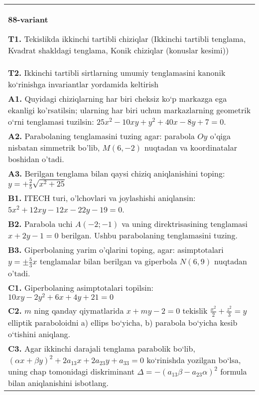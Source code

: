 \documentclass{article}
\begin{document}
\begin{tabular}{m{17cm}}
\textbf{88-variant}
\newline

\textbf{T1.} Tekislikda ikkinchi tartibli chiziqlar (Ikkinchi tartibli tenglama, Kvadrat shakldagi tenglama, Konik chiziqlar (konuslar kesimi)) \\
\textbf{T2.} Ikkinchi tartibli sirtlarning umumiy tenglamasini kanonik ko‘rinishga invariantlar yordamida keltirish \\
\textbf{A1.} Quyidagi chiziqlarning har biri cheksiz ko‘p markazga ega ekanligi ko'rsatilsin; ularning har biri uchun markazlarning geometrik o‘rni tenglamasi tuzilsin: $25 x^2-10 x y+y^2+40 x-8 y+7=0$. \\
\textbf{A2.} Parabolaning tenglamasini tuzing agar: parabola $O y$ o'qiga nisbatan simmetrik bo'lib, $M(6,-2)$ nuqtadan va koordinatalar boshidan o'tadi. \\
\textbf{A3.} Berilgan tenglama bilan qaysi chiziq aniqlanishini toping: $y=+\frac{2}{5} \sqrt{x^2+25}$ \\
\textbf{B1.} ITECH turi, o'lchovlari va joylashishi aniqlansin: $5 x^2+12 x y-12 x-22 y-19=0$. \\
\textbf{B2.} Parabola uchi $A(-2;-1)$ va uning direktrisasining tenglamasi $x+2y-1=0$ berilgan. Ushbu parabolaning tenglamasini tuzing. \\
\textbf{B3.} Giperbolaning yarim o'qlarini toping, agar: asimptotalari $y= \pm \frac{5}{3} x$ tenglamalar bilan berilgan va giperbola $N(6,9)$ nuqtadan o'tadi. \\
\textbf{C1.} Giperbolaning asimptotalari topilsin: $10 x y-2 y^2+6 x+4 y+21=0$ \\
\textbf{C2.} $m$ ning qanday qiymatlarida $x+m y-2=0$ tekislik $\frac{x^2}{2}+\frac{z^2}{3}=y$ elliptik paraboloidni a) ellips bo‘yicha, b) parabola bo‘yicha kesib o‘tishini aniqlang. \\
\textbf{C3.} Agar ikkinchi darajali tenglama parabolik bo‘lib, $ (\alpha x+\beta y) ^2+2a_{13}x+2a_{23}y+a_{33}=0$ ko‘rinishda yozilgan bo‘lsa, uning chap tomonidagi diskriminant $\Delta=- (a_{13} \beta-a_{23} \alpha) ^2$ formula bilan aniqlanishini isbotlang. \\

\end{tabular}
\vspace{1cm}
\end{document}
